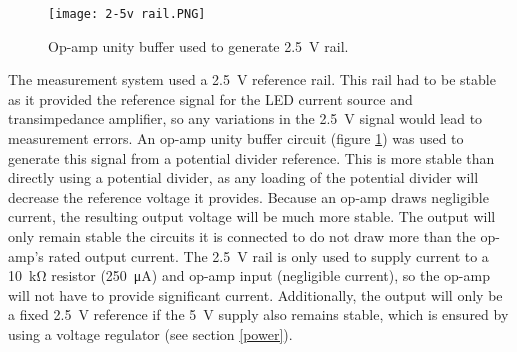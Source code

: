 \begin{figure}[htbp]
	\centering
	\texttt{[image: 2-5v rail.PNG]}
	\caption{Op-amp unity buffer used to generate \SI{2.5}{\volt} rail.}
	\label{fig: 2.5v rail}
\end{figure}

The measurement system used a \SI{2.5}{\volt} reference rail. This rail had to be stable as it provided the reference signal for the LED current source and transimpedance amplifier, so any variations in the \SI{2.5}{\volt} signal would lead to measurement errors. An op-amp unity buffer circuit (figure \ref{fig: 2.5v rail}) was used to generate this signal from a potential divider reference. This is more stable than directly using a potential divider, as any loading of the potential divider will decrease the reference voltage it provides. Because an op-amp draws negligible current, the resulting output voltage will be much more stable. The output will only remain stable the circuits it is connected to do not draw more than the op-amp's rated output current. The \SI{2.5}{\volt} rail is only used to supply current to a \SI{10}{\kilo\ohm} resistor (\SI{250}{\micro\ampere}) and op-amp input (negligible current), so the op-amp will not have to provide significant current. Additionally, the output will only be a fixed \SI{2.5}{\volt} reference if the \SI{5}{\volt} supply also remains stable, which is ensured by using a voltage regulator (see section \ref{power}).\\




